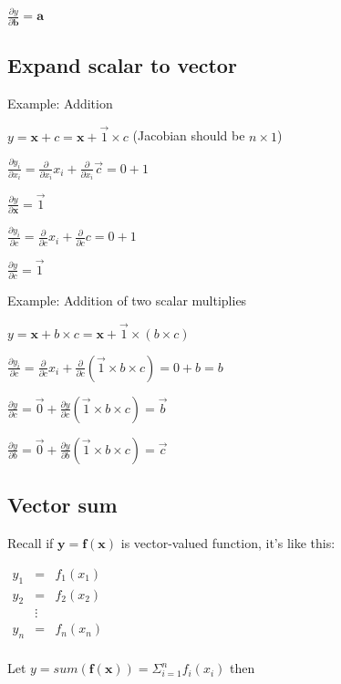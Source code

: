 \documentclass[11pt]{article}
\begin{document}
$\frac{\partial y}{\partial \mathbf{b}} = \mathbf{a}$

\subsection{Expand scalar to vector}

Example: Addition

$y = \mathbf{x} + c = \mathbf{x} + \vec{1} \times c$ (Jacobian should be $n \times 1$)

$\frac{\partial y_i}{\partial x_i} = \frac{\partial}{\partial x_i} x_i + \frac{\partial}{\partial x_i} \vec{c} = 0 + 1$

$\frac{\partial y}{\partial \mathbf{x}} = \vec{1}$

$\frac{\partial y_i}{\partial c} = \frac{\partial}{\partial c} x_i + \frac{\partial}{\partial c} c = 0 + 1$

$\frac{\partial y}{\partial c} = \vec{1}$

Example: Addition of two scalar multiplies

$y = \mathbf{x} + b \times c = \mathbf{x} + \vec{1} \times (b \times c)$

$\frac{\partial y_i}{\partial c}
 = \frac{\partial}{\partial c} x_i + \frac{\partial}{\partial c} (\vec{1} \times b \times c)
 = 0 + b
 = b
$

$\frac{\partial y}{\partial c}
  = \vec{0} + \frac{\partial y}{\partial c} (\vec{1} \times b \times c)
  = \vec{b}$

$\frac{\partial y}{\partial b}
  = \vec{0} + \frac{\partial y}{\partial b} (\vec{1} \times b \times c)
  = \vec{c}$

\subsection{Vector sum}
 
Recall if $\mathbf{y} = \mathbf{f}(\mathbf{x})$ is vector-valued function, it's like this:

$
\begin{array}{lcl}
y_1 & = & f_1(x_1)\\
y_2 & = & f_2(x_2)\\
 & \vdots & \\
y_n & = & f_n(x_n)\\
\end{array}
$

Let $y = sum( \mathbf{f}(\mathbf{x})) = \Sigma_{i=1}^n f_i(x_i)$ then
\end{document}
